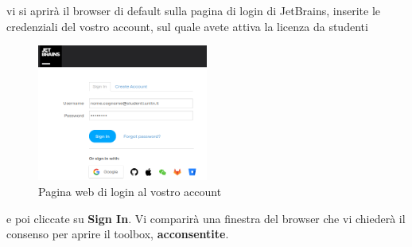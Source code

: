         vi si aprirà il browser di default sulla pagina di login di JetBrains, inserite le credenziali del vostro account, sul quale avete 
        attiva la licenza da studenti
        \begin{figure}[H]
            \centering
            \graphicspath{{src/capitoli/04/img/}}
            \includegraphics[width=0.5\textwidth]{toolbox-login-web.png}
            \caption{Pagina web di login al vostro account}
            \label{fig:Pagina web di login al vostro account}
        \end{figure}
        e poi cliccate su \textbf{Sign In}. Vi comparirà una finestra del browser che vi chiederà il consenso per aprire il toolbox, \textbf{acconsentite}.
        
